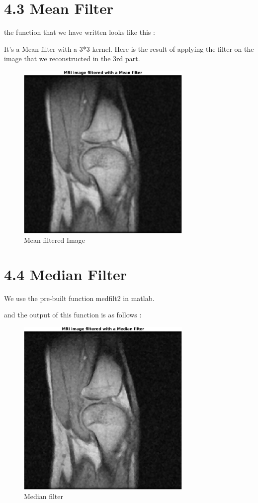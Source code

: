 \documentclass[12pt,fleqn]{article}
\begin{document}
\section{4.3 Mean Filter}
the function that we have written looks like this :

It's a Mean filter with a 3*3 kernel. Here is the result of applying the filter on the image that we reconstructed in the 3rd part.
\begin{figure}[H]
	\centering
	\includegraphics[width=0.75\textwidth]{meanFilteredImage.png}
	\caption{Mean filtered Image}
	\label{fig:2.3.3}
\end{figure}
\section{4.4 Median Filter}
We use the pre-built function medfilt2 in matlab.

and the output of this function is as follows :
\begin{figure}[H]
	\centering
	\includegraphics[width=0.75\textwidth]{medianFilteredImage.png}
	\caption{Median filter}
	\label{fig:2.3.3}
\end{figure}
\end{document}
